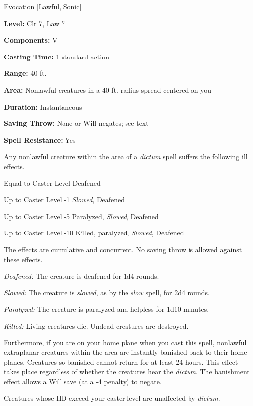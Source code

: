 
Evocation [Lawful, Sonic]

\textbf{Level:} Clr 7, Law 7

\textbf{Components:} V

\textbf{Casting Time:} 1 standard action

\textbf{Range:} 40 ft.

\textbf{Area:} Nonlawful creatures in a 40-ft.-radius spread centered on you

\textbf{Duration:} Instantaneous

\textbf{Saving Throw:} None or Will negates; see text

\textbf{Spell Resistance:} Yes

Any nonlawful creature within the area of a \textit{dictum} spell suffers the following 
ill effects.

\begin{description*}
\item[Equal to Caster Level] Deafened
\item[Up to Caster Level -1] \textit{Slowed}, Deafened
\item[Up to Caster Level -5] Paralyzed, \textit{Slowed}, Deafened
\item[Up to Caster Level -10] Killed, paralyzed, \textit{Slowed}, Deafened
\end{description*}

The effects are cumulative and concurrent. No saving throw is allowed against these 
effects.

\textit{Deafened:} The creature is deafened for 1d4 rounds.

\textit{Slowed:} The creature is \textit{slowed}, as by the \textit{slow} spell, 
for 2d4 rounds.

\textit{Paralyzed:} The creature is paralyzed and helpless for 1d10 minutes.

\textit{Killed:} Living creatures die. Undead creatures are destroyed.

Furthermore, if you are on your home plane when you cast this spell, nonlawful 
extraplanar creatures within the area are instantly banished back to their home 
planes. Creatures so banished cannot return for at least 24 hours. This effect 
takes place regardless of whether the creatures hear the \textit{dictum}. The banishment 
effect allows a Will save (at a -4 penalty) to negate.

Creatures whose HD exceed your caster level are unaffected by \textit{dictum}.

